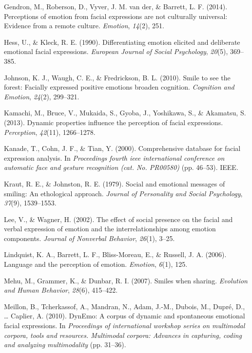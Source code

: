 \documentclass[man]{apa6}
\begin{document}
\leavevmode\hypertarget{ref-gendron2014perceptions}{}%
Gendron, M., Roberson, D., Vyver, J. M. van der, \& Barrett, L. F. (2014). Perceptions of emotion from facial expressions are not culturally universal: Evidence from a remote culture. \emph{Emotion}, \emph{14}(2), 251.

\leavevmode\hypertarget{ref-hess1990differentiating}{}%
Hess, U., \& Kleck, R. E. (1990). Differentiating emotion elicited and deliberate emotional facial expressions. \emph{European Journal of Social Psychology}, \emph{20}(5), 369--385.

\leavevmode\hypertarget{ref-johnson2010smile}{}%
Johnson, K. J., Waugh, C. E., \& Fredrickson, B. L. (2010). Smile to see the forest: Facially expressed positive emotions broaden cognition. \emph{Cognition and Emotion}, \emph{24}(2), 299--321.

\leavevmode\hypertarget{ref-kamachi2013dynamic}{}%
Kamachi, M., Bruce, V., Mukaida, S., Gyoba, J., Yoshikawa, S., \& Akamatsu, S. (2013). Dynamic properties influence the perception of facial expressions. \emph{Perception}, \emph{42}(11), 1266--1278.

\leavevmode\hypertarget{ref-kanade2000comprehensive}{}%
Kanade, T., Cohn, J. F., \& Tian, Y. (2000). Comprehensive database for facial expression analysis. In \emph{Proceedings fourth ieee international conference on automatic face and gesture recognition (cat. No. PR00580)} (pp. 46--53). IEEE.

\leavevmode\hypertarget{ref-kraut1979social}{}%
Kraut, R. E., \& Johnston, R. E. (1979). Social and emotional messages of smiling: An ethological approach. \emph{Journal of Personality and Social Psychology}, \emph{37}(9), 1539--1553.

\leavevmode\hypertarget{ref-lee2002effect}{}%
Lee, V., \& Wagner, H. (2002). The effect of social presence on the facial and verbal expression of emotion and the interrelationships among emotion components. \emph{Journal of Nonverbal Behavior}, \emph{26}(1), 3--25.

\leavevmode\hypertarget{ref-lindquist2006language}{}%
Lindquist, K. A., Barrett, L. F., Bliss-Moreau, E., \& Russell, J. A. (2006). Language and the perception of emotion. \emph{Emotion}, \emph{6}(1), 125.

\leavevmode\hypertarget{ref-mehu2007smiles}{}%
Mehu, M., Grammer, K., \& Dunbar, R. I. (2007). Smiles when sharing. \emph{Evolution and Human Behavior}, \emph{28}(6), 415--422.

\leavevmode\hypertarget{ref-meillon2010dynemo}{}%
Meillon, B., Tcherkassof, A., Mandran, N., Adam, J.-M., Dubois, M., Dupré, D., \ldots{} Caplier, A. (2010). DynEmo: A corpus of dynamic and spontaneous emotional facial expressions. In \emph{Proceedings of international workshop series on multimodal corpora, tools and resources. Multimodal corpora: Advances in capturing, coding and analyzing multimodality} (pp. 31--36).
\end{document}
